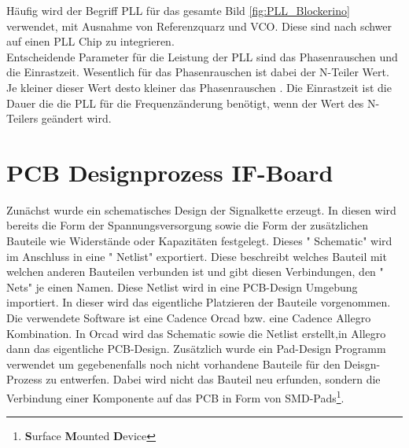 Häufig wird der Begriff PLL für das gesamte Bild \ref{fig:PLL_Blockerino} verwendet, mit Ausnahme von Referenzquarz und VCO. Diese sind nach \cite[S.10]{PLL_Perf} schwer auf einen PLL Chip zu integrieren.\\
Entscheidende Parameter für die Leistung der PLL sind das Phasenrauschen und die Einrastzeit. Wesentlich für das Phasenrauschen ist dabei der N-Teiler Wert. Je kleiner dieser Wert desto kleiner das Phasenrauschen \cite[S.10]{PLL_Perf} . Die Einrastzeit ist die Dauer die die PLL für die Frequenzänderung benötigt, wenn der Wert des N-Teilers geändert wird.
\section{PCB Designprozess IF-Board}
Zunächst wurde ein schematisches Design der Signalkette erzeugt. In diesen wird bereits die Form der Spannungsversorgung sowie die Form der zusätzlichen Bauteile wie Widerstände oder Kapazitäten festgelegt. Dieses " Schematic" wird im Anschluss in eine " Netlist" exportiert. Diese beschreibt welches Bauteil mit welchen anderen Bauteilen verbunden ist und gibt diesen Verbindungen, den " Nets" je einen Namen. Diese Netlist wird in eine PCB-Design Umgebung importiert. In dieser wird das eigentliche Platzieren der Bauteile vorgenommen. \\
Die verwendete Software ist eine Cadence Orcad bzw. eine Cadence Allegro Kombination. In Orcad wird das Schematic sowie die Netlist erstellt,in Allegro dann das eigentliche PCB-Design. Zusätzlich wurde ein Pad-Design Programm verwendet um gegebenenfalls noch nicht vorhandene Bauteile für den Deisgn-Prozess zu entwerfen. Dabei wird nicht das Bauteil neu erfunden, sondern die Verbindung einer Komponente auf das PCB in Form von SMD-Pads\footnote{\textbf{S}urface \textbf{M}ounted \textbf{D}evice}. \\


